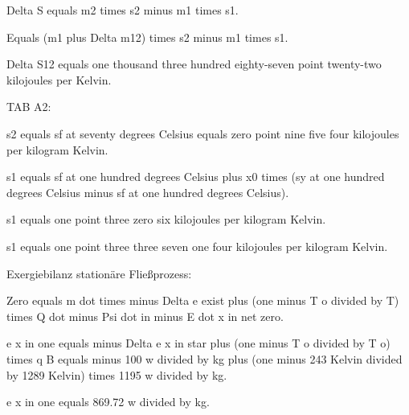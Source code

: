 Delta S equals m2 times s2 minus m1 times s1.

Equals (m1 plus Delta m12) times s2 minus m1 times s1.

Delta S12 equals one thousand three hundred eighty-seven point twenty-two kilojoules per Kelvin.

TAB A2:

s2 equals sf at seventy degrees Celsius equals zero point nine five four kilojoules per kilogram Kelvin.

s1 equals sf at one hundred degrees Celsius plus x0 times (sy at one hundred degrees Celsius minus sf at one hundred degrees Celsius).

s1 equals one point three zero six kilojoules per kilogram Kelvin. 

s1 equals one point three three seven one four kilojoules per kilogram Kelvin.

Exergiebilanz stationäre Fließprozess:

Zero equals m dot times minus Delta e exist plus (one minus T o divided by T) times Q dot minus Psi dot in minus E dot x in net zero.

e x in one equals minus Delta e x in star plus (one minus T o divided by T o) times q B equals minus 100 w divided by kg plus (one minus 243 Kelvin divided by 1289 Kelvin) times 1195 w divided by kg.

e x in one equals 869.72 w divided by kg.